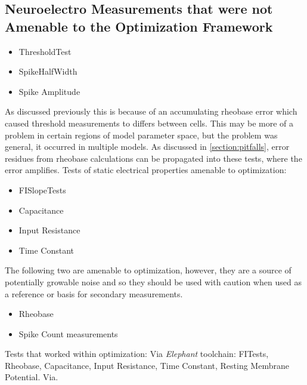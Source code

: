 
\subsection{Neuroelectro Measurements that were not Amenable to the Optimization Framework}
\begin{itemize}
\item ThresholdTest
\item SpikeHalfWidth
\item Spike Amplitude
\end{itemize}
As discussed previously this is because of an accumulating rheobase error which caused threshold measurements to differs between cells. This may be more of a problem in certain regions of model parameter space, but the problem was general, it occurred in multiple models. As discussed in \ref{section:pitfalls}, error residues from rheobase calculations can be propagated into these tests, where the error amplifies.
Tests of static electrical properties amenable to optimization:
\begin{itemize}
\item FISlopeTests
\item Capacitance
\item Input Resistance
\item Time Constant 
\end{itemize}

The following two are amenable to optimization, however, they are a source of potentially growable noise and so they should be used with caution when used as a reference or basis for secondary measurements.
\begin{itemize}
\item Rheobase 
\item Spike Count measurements \end{itemize}



Tests that worked within optimization:
Via \emph{Elephant} toolchain: FITests, Rheobase, Capacitance, Input Resistance, Time Constant, Resting Membrane Potential.
Via. 

